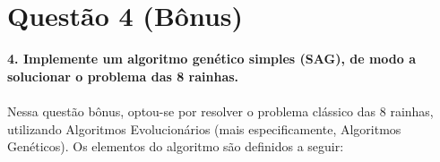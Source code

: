 \documentclass{report}
\begin{document}
	\section*{Questão 4 (Bônus)}
	
	\textbf{4. Implemente um algoritmo genético simples (SAG), de modo a solucionar o problema das 8 rainhas.}\\

	\paragraph{} Nessa questão bônus, optou-se por resolver o problema clássico das 8 rainhas, utilizando Algoritmos Evolucionários (mais especificamente, Algoritmos Genéticos). Os elementos do algoritmo são definidos a seguir:\\
	
\end{document}
